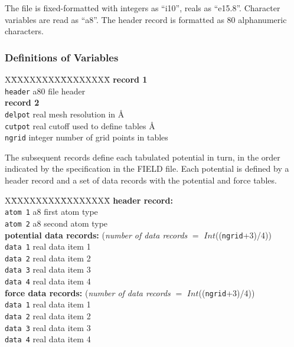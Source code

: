 The file is fixed-formatted with integers as ``i10'', reals as
``e15.8''. Character variables are read as ``a8''.  The header record
is formatted as 80 alphanumeric characters.

\subsubsection{Definitions of Variables}

\begin{tabbing}
X\=XXXXXXXX\=XXXXXXXX\=\kill
{\bf record 1}\\
\> {\tt header} \> a80 \> file header\\
{\bf record 2}\\
\> {\tt delpot} \> real \> mesh resolution in \AA\\
\> {\tt cutpot} \> real \> cutoff used to define tables \AA\\
\> {\tt ngrid} \> integer \> number of grid points in tables\\
\end{tabbing}
The subsequent records define each tabulated potential in turn, {in the
order indicated by the specification in the FIELD file}. Each
potential is defined by a header record and a set of data records with
the potential and force tables.

\begin{tabbing}
X\=XXXXXXXX\=XXXXXXXX\=\kill
{\bf header record:}\\
\> {\tt atom 1}\> a8 \> first atom type \\
\> {\tt atom 2}\> a8 \> second atom type \\
{\bf potential data records:} ({\em number of data records} $=$ $Int$(({\tt ngrid}+3)/4))\\
\> {\tt data 1} \> real \> data item 1\\
\> {\tt data 2} \> real \> data item 2\\
\> {\tt data 3} \> real \> data item 3\\
\> {\tt data 4} \> real \> data item 4\\
{\bf force data records:} ({\em number of data records} $=$ $Int$(({\tt ngrid}+3)/4))\\
\> {\tt data 1} \> real \> data item 1\\
\> {\tt data 2} \> real \> data item 2\\
\> {\tt data 3} \> real \> data item 3\\
\> {\tt data 4} \> real \> data item 4\\
\end{tabbing}

